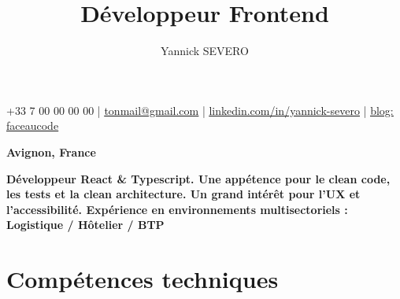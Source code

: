 \documentclass{article}
\title{Développeur Frontend}
\author{Yannick SEVERO}
\date{}
\begin{document}
\maketitle
\thispagestyle{empty} %
\vspace{-4em}

\begin{center}
+33 7 00 00 00 00 | \href{mailto:tonmail@gmail.com}{\underline{tonmail@gmail.com}} | \href{https://linkedin.com/in/yannick-severo}{\underline{linkedin.com/in/yannick-severo}} | \href{https://www.faceaucode.com/}{\underline{blog: faceaucode}}
\end{center}
\begin{center}
\textbf{Avignon, France}
\end{center}


\begin{center}
\textbf{Développeur React \& Typescript. Une appétence pour le clean code, les tests et la clean architecture. Un grand intérêt pour l'UX et l'accessibilité. Expérience en environnements multisectoriels : Logistique / Hôtelier / BTP}
\end{center}

\section*{Compétences techniques}
\end{document}
